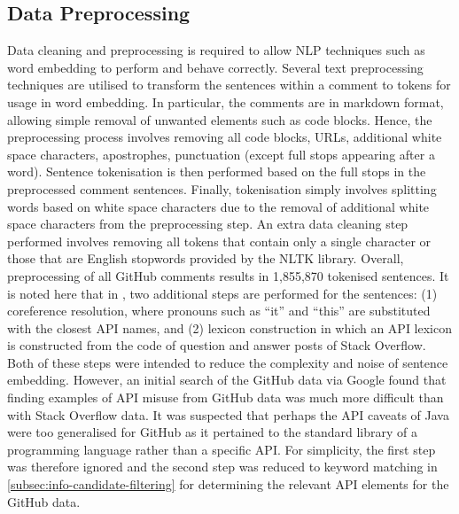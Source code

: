 
\subsection{Data Preprocessing}
\label{subsec:info-data-preprocess}
Data cleaning and preprocessing is required to allow NLP techniques such as word embedding to perform and behave correctly. Several text preprocessing techniques are utilised to transform the sentences within a comment to tokens for usage in word embedding. In particular, the comments are in markdown format, allowing simple removal of unwanted elements such as code blocks. Hence, the preprocessing process involves removing all code blocks, URLs, additional white space characters, apostrophes, punctuation (except full stops appearing after a word). Sentence tokenisation is then performed based on the full stops in the preprocessed comment sentences. Finally, tokenisation simply involves splitting words based on white space characters due to the removal of additional white space characters from the preprocessing step. An extra data cleaning step performed involves removing all tokens that contain only a single character or those that are English stopwords provided by the NLTK library. Overall, preprocessing of all GitHub comments results in 1,855,870 tokenised sentences. It is noted here that in \cite{jiamou}, two additional steps are performed for the sentences: (1) coreference resolution, where pronouns such as ``it'' and ``this'' are substituted with the closest API names, and (2) lexicon construction in which an API lexicon is constructed from the code of question and answer posts of Stack Overflow. Both of these steps were intended to reduce the complexity and noise of sentence embedding. However, an initial search of the GitHub data via Google found that finding examples of API misuse from GitHub data was much more difficult than with Stack Overflow data. It was suspected that perhaps the API caveats of Java were too generalised for GitHub as it pertained to the standard library of a programming language rather than a specific API. For simplicity, the first step was therefore ignored and the second step was reduced to keyword matching in \ref{subsec:info-candidate-filtering} for determining the relevant API elements for the GitHub data.

